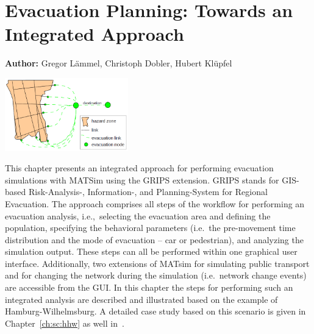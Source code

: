 \chapter{Evacuation Planning: Towards an Integrated Approach}
\label{ch:evacuation}

\hfill \textbf{Author:} Gregor Lämmel, Christoph Dobler, Hubert Klüpfel 

\begin{center} \includegraphics[width=0.4\textwidth, angle=0]{extending/figures/Evacuation/evacuation} \end{center}

This chapter presents an integrated approach for performing evacuation simulations with MATSim using the GRIPS extension. GRIPS stands for  GIS-based Risk-Analysis-, Information-, and Planning-System for Regional Evacuation. 
The approach comprises all steps of the workflow for performing an evacuation analysis, i.e.,\, 
selecting the evacuation area and defining the population, specifying the behavioral parameters 
(i.e.\ the pre-movement time distribution and the mode of evacuation -- car or pedestrian), 
and analyzing the simulation output.
These steps can all be performed within one graphical user interface.
Additionally, two extensions of MATsim for simulating public transport and for changing the network 
during the simulation (i.e.\ network change events) are accessible from the GUI.
In this chapter the steps for performing such an integrated analysis are described and illustrated based on
the example of Hamburg-Wilhelmsburg. A detailed case study based on this scenario is given in Chapter~\ref{ch:sc:hhw} as well in~\cite{DurstAtAl2012PEDGRIPSAppl,Hugenbusch2012Bachelor}.

